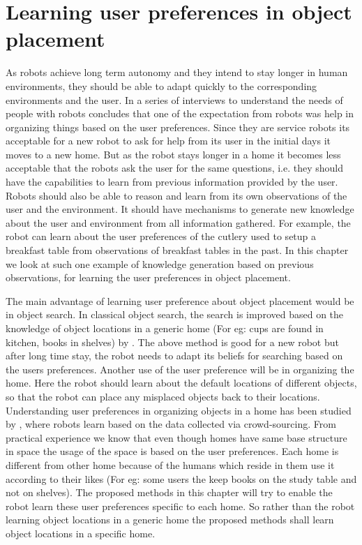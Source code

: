 \chapter{Learning user preferences in object placement}
\label{chapter: object}

As robots achieve long term autonomy and they intend to stay longer in human environments, they should be able to adapt quickly to the corresponding environments and the user.  In a series of interviews to understand the needs of people with robots \cite{pantofaru_exploring_2012} concludes that one of the
expectation from robots was help in organizing things based on the user preferences. Since they are service robots its acceptable for a new robot to ask for help from its user in the initial days it moves to a new home. But as the robot stays longer in a home it becomes less acceptable that the robots ask the user for the same questions, i.e. they should have the capabilities to learn from previous information provided by the user. Robots should also be able to reason and learn from its own observations of the user and the environment. It should have mechanisms to generate new knowledge about the user and environment from all information gathered. For example, the robot can learn about the user preferences of the cutlery used to setup a breakfast table from observations of breakfast tables in the past. In this chapter we look at such one example of knowledge generation based on previous observations, for learning the user preferences in object placement.

The main advantage of learning user preference about object placement would be in object search. In classical object search, the search is improved based on the knowledge of object locations in a generic home (For eg: cups are found in kitchen, books in shelves) by \cite{samadi_using_2012, joho_learning_2011}. The above method is good for a new robot but after long time stay, the robot needs to adapt its beliefs for searching based on the users preferences. Another use of the user preference will be in organizing the home. Here the robot should learn  about the default locations of different objects, so that the robot can place any misplaced objects back to their locations. Understanding user preferences in organizing objects in a home has 
been studied by  \cite{abdo_collaborative_2014}, where robots learn based on the data collected via crowd-sourcing.  From practical experience we know that even though homes have same base structure in space the usage of the space is based on the user preferences. Each home is different from other home because of the humans which reside in them use it according to their likes (For eg: some users the keep books on the study table and not on shelves). The proposed methods in this chapter will try to enable the robot learn these user preferences specific to each home. So rather than the robot learning object locations in a generic home the proposed methods shall learn object locations in a specific home.


